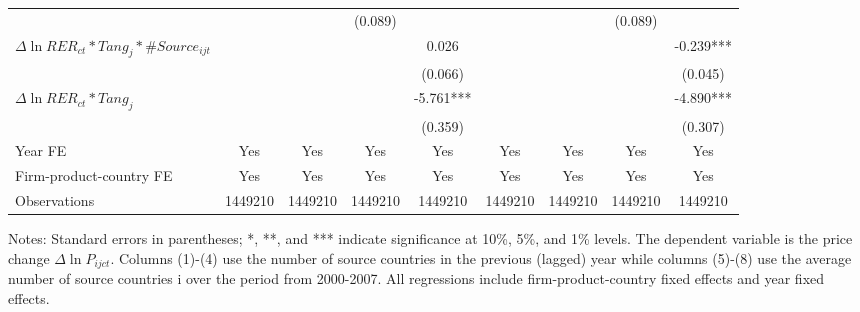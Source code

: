 \documentclass[12pt]{article}
\begin{document}
\begin{table}
{\begin{threeparttable}
\begin{tabular}{lcccccccc}
				&       &       & (0.089) &  &       &       & (0.089) &\\
				$\Delta \ln RER_{ct}*Tang_{j}*\#Source_{ijt}$ &       &       &       & 0.026
				 &       &       &       & -0.239***\\
				&       &       &       & (0.066) &       &       &       & (0.045)\\
				$\Delta \ln RER_{ct}*Tang_{j}$ &       &       &       & -5.761*** &       &       &       & -4.890***\\
				&       &       &       & (0.359) &       &       &       & (0.307)\\
				Year FE  & Yes   & Yes   & Yes   & Yes & Yes   & Yes   & Yes   & Yes\\
				Firm-product-country FE & Yes   & Yes   & Yes   & Yes & Yes   & Yes   & Yes   & Yes\\
				Observations & 1449210 & 1449210 & 1449210 & 1449210 & 1449210 & 1449210 & 1449210 & 1449210\\
				\bottomrule
			\end{tabular}
			\begin{tablenotes}
				\footnotesize
				\item[Notes:] Standard errors in parentheses; *, **, and *** indicate significance at 10\%, 5\%, and 1\% levels. The dependent variable is the price change $\Delta \ln P_{ijct}$. Columns (1)-(4) use the number of source countries in the previous (lagged) year while columns (5)-(8) use the average number of source countries i over the period from 2000-2007. All regressions include firm-product-country fixed effects and year fixed effects.
			\end{tablenotes}
		\end{threeparttable}
	}
	\label{tab.source.lag}
\end{table}
\end{document}
